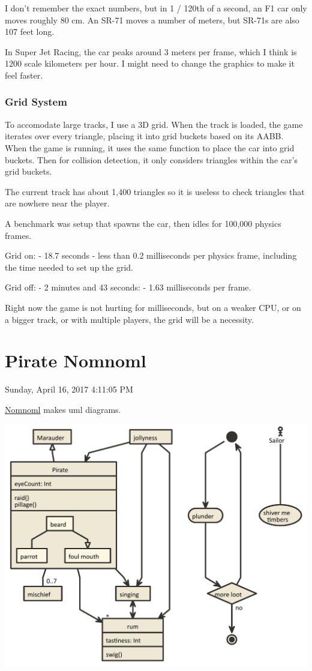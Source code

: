 \documentclass[]{book}
\begin{document}
I don't remember the exact numbers, but in 1 / 120th of a second, an F1
car only moves roughly 80 cm. An SR-71 moves a number of meters, but
SR-71s are also 107 feet long.

In Super Jet Racing, the car peaks around 3 meters per frame, which I
think is 1200 scale kilometers per hour. I might need to change the
graphics to make it feel faster.

\subsection{Grid System}\label{grid-system}

To accomodate large tracks, I use a 3D grid. When the track is loaded,
the game iterates over every triangle, placing it into grid buckets
based on its AABB. When the game is running, it uses the same function
to place the car into grid buckets. Then for collision detection, it
only considers triangles within the car's grid buckets.

The current track has about 1,400 triangles so it is useless to check
triangles that are nowhere near the player.

A benchmark was setup that spawns the car, then idles for 100,000
physics frames.

Grid on: - 18.7 seconds - less than 0.2 milliseconds per physics frame,
including the time needed to set up the grid.

Grid off: - 2 minutes and 43 seconds: - 1.63 milliseconds per frame.

Right now the game is not hurting for milliseconds, but on a weaker CPU,
or on a bigger track, or with multiple players, the grid will be a
necessity.

\chapter{Pirate Nomnoml}\label{pirate-nomnoml}

 Sunday, April 16, 2017 4:11:05 PM

\href{http://nomnoml.com}{Nomnoml} makes uml diagrams.

\includegraphics{Image/Pirate.nomnoml.pdf}
\end{document}
